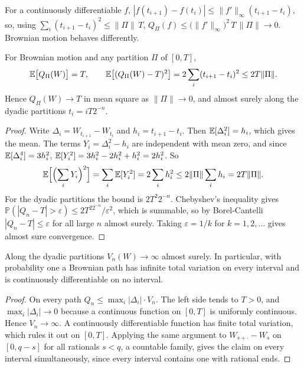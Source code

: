 \begin{chapterrefs}
For a continuously differentiable $f$, $|f(t_{i+1})-f(t_i)|\le\lVert f'\rVert_\infty(t_{i+1}-t_i)$, so, using
$\sum_i(t_{i+1}-t_i)^2\le\lVert\Pi\rVert\,T$,
$Q_\Pi(f)\le\bigl(\lVert f'\rVert_\infty\bigr)^2\,T\,\lVert\Pi\rVert\to0$. Brownian motion behaves differently.

\begin{theorem}\label{thm3:qv}
For Brownian motion and any partition $\Pi$ of $[0,T]$,
\begin{equation}\label{eq3:qvmoments}
  \mathbb{E}\bigl[Q_\Pi(W)\bigr]=T,\qquad
  \mathbb{E}\bigl[(Q_\Pi(W)-T)^2\bigr]=2\sum_{i}(t_{i+1}-t_i)^2\le 2T\lVert\Pi\rVert .
\end{equation}
Hence $Q_\Pi(W)\to T$ in mean square as $\lVert\Pi\rVert\to0$, and almost surely along the dyadic
partitions $t_i=iT2^{-n}$.
\end{theorem}

\begin{proof}
Write $\Delta_i=W_{t_{i+1}}-W_{t_i}$ and $h_i=t_{i+1}-t_i$. Then $\mathbb{E}[\Delta_i^2]=h_i$, which gives the
mean. The terms $Y_i=\Delta_i^2-h_i$ are independent with mean zero, and since $\mathbb{E}[\Delta_i^4]=3h_i^2$,
$\mathbb{E}[Y_i^2]=3h_i^2-2h_i^2+h_i^2=2h_i^2$. So
\begin{equation*}
  \mathbb{E}\Bigl[\Bigl(\sum_i Y_i\Bigr)^2\Bigr]=\sum_i\mathbb{E}[Y_i^2]=2\sum_i h_i^2\le 2\lVert\Pi\rVert\sum_i h_i = 2T\lVert\Pi\rVert .
\end{equation*}
For the dyadic partitions the bound is $2T^2 2^{-n}$. Chebyshev's inequality gives
$\mathbb P(|Q_n-T|>\varepsilon)\le 2T^22^{-n}/\varepsilon^2$, which is summable, so by Borel-Cantelli
$|Q_n-T|\le\varepsilon$ for all large $n$ almost surely. Taking $\varepsilon=1/k$ for $k=1,2,\dots$ gives
almost sure convergence.
\end{proof}

\begin{corollary}\label{cor3:tv}
Along the dyadic partitions $V_n(W)\to\infty$ almost surely. In particular, with probability one a
Brownian path has infinite total variation on every interval and is continuously differentiable on no
interval.
\end{corollary}

\begin{proof}
On every path $Q_n\le\max_i|\Delta_i|\cdot V_n$. The left side tends to $T>0$, and $\max_i|\Delta_i|\to0$
because a continuous function on $[0,T]$ is uniformly continuous. Hence $V_n\to\infty$. A continuously
differentiable function has finite total variation, which rules it out on $[0,T]$. Applying the
same argument to $W_{s+\cdot}-W_s$ on $[0,q-s]$ for all rationals $s<q$, a countable family, gives
the claim on every interval simultaneously, since every interval contains one with rational ends.
\end{proof}


\end{chapterrefs}
